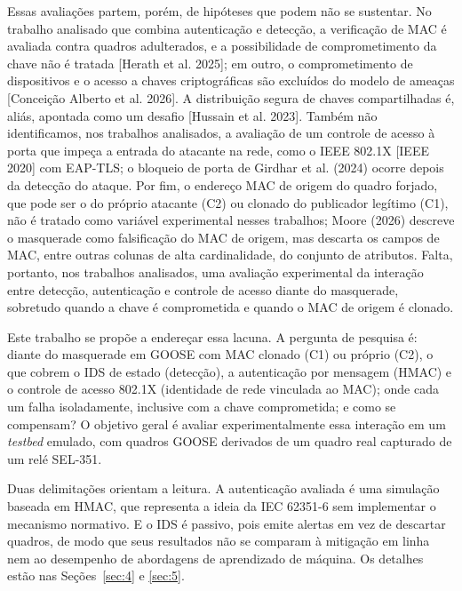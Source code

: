 \documentclass[12pt]{article}
\newcommand{\cit}[2]{[#1]\nocite{#2}}
\newcommand{\citn}[2]{#1\nocite{#2}}
\begin{document}
Essas avaliações partem, porém, de hipóteses que podem não se sustentar. No trabalho analisado que combina autenticação e detecção, a verificação de MAC é avaliada contra quadros adulterados, e a possibilidade de comprometimento da chave não é tratada \cit{Herath et al. 2025}{herath2025evaluation}; em outro, o comprometimento de dispositivos e o acesso a chaves criptográficas são excluídos do modelo de ameaças \cit{Conceição Alberto et al. 2026}{alberto2026gooseidrs}. A distribuição segura de chaves compartilhadas é, aliás, apontada como um desafio \cit{Hussain et al. 2023}{hussain2023hybrid}. Também não identificamos, nos trabalhos analisados, a avaliação de um controle de acesso à porta que impeça a entrada do atacante na rede, como o IEEE 802.1X \cit{IEEE 2020}{ieee8021x} com EAP-TLS; o bloqueio de porta de \citn{Girdhar et al. (2024)}{girdhar2024sdn} ocorre depois da detecção do ataque. Por fim, o endereço MAC de origem do quadro forjado, que pode ser o do próprio atacante (C2) ou clonado do publicador legítimo (C1), não é tratado como variável experimental nesses trabalhos; \citn{Moore (2026)}{moore2026anomaly} descreve o masquerade como falsificação do MAC de origem, mas descarta os campos de MAC, entre outras colunas de alta cardinalidade, do conjunto de atributos. Falta, portanto, nos trabalhos analisados, uma avaliação experimental da interação entre detecção, autenticação e controle de acesso diante do masquerade, sobretudo quando a chave é comprometida e quando o MAC de origem é clonado.

Este trabalho se propõe a endereçar essa lacuna. A pergunta de pesquisa é: diante do masquerade em GOOSE com MAC clonado (C1) ou próprio (C2), o que cobrem o IDS de estado (detecção), a autenticação por mensagem (HMAC) e o controle de acesso 802.1X (identidade de rede vinculada ao MAC); onde cada um falha isoladamente, inclusive com a chave comprometida; e como se compensam? O objetivo geral é avaliar experimentalmente essa interação em um \emph{testbed} emulado, com quadros GOOSE derivados de um quadro real capturado de um relé SEL-351.

Duas delimitações orientam a leitura. A autenticação avaliada é uma simulação baseada em HMAC, que representa a ideia da IEC 62351-6 sem implementar o mecanismo normativo. E o IDS é passivo, pois emite alertas em vez de descartar quadros, de modo que seus resultados não se comparam à mitigação em linha nem ao desempenho de abordagens de aprendizado de máquina. Os detalhes estão nas Seções~\ref{sec:4} e \ref{sec:5}.
\end{document}
